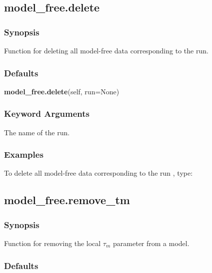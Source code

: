 


\newpage

\subsection{model\_free.delete}


\subsubsection{Synopsis}

Function for deleting all model-free data corresponding to the run.

\subsubsection{Defaults}

\textsf{\textbf{model\_free.delete}(self, run=None)}


\subsubsection{Keyword Arguments}


  The name of the run.

\subsubsection{Examples}

To delete all model-free data corresponding to the run 
, type:




\newpage

\subsection{model\_free.remove\_tm}


\subsubsection{Synopsis}

Function for removing the local $\tau_m$ parameter from a model.

\subsubsection{Defaults}

